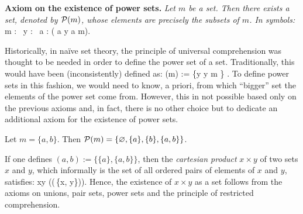 \textbf{Axiom on the existence of power sets.} \emph{Let $m$ be a set. Then there exists a set, denoted by $\mathcal{P}(m)$, whose elements are precisely the subsets of $m$. In symbols:}
\bse
\forall \, m : \exists \, y : \forall \, a : ( a \in y \eqv a \se m).
\ese

Historically, in na\"ive set theory, the principle of universal comprehension was thought to be needed in order to define the power set of a set. Traditionally, this would have been (inconsistently) defined as:
\bse
\cP (m) := \{y \mid y \se m \} .
\ese
To define power sets in this fashion, we would need to know, a priori, from which ``bigger'' set the elements of the power set come from. However, this in not possible based only on the previous axioms and, in fact, there is no other choice but to dedicate an additional axiom for the existence of power sets.

\be
Let $m = \{a,b\}$. Then $\mathcal{P}(m)=\{\varnothing,\{a\},\{b\},\{a,b\}\}$.
\ee

\br
If one defines $(a,b) := \{\{a\},\{a,b\}\}$, then the \emph{cartesian product} $x \times y$ of two sets $x$ and $y$, which informally is the set of all ordered pairs of elements of $x$ and $y$, satisfies:
\bse
x\times y \se \cP\left(\cP\left(\bigcup\,\{x, y\}\right)\right).
\ese
Hence, the existence of $x\times y$ as a set follows from the axioms on unions, pair sets, power sets and the principle of restricted comprehension.
\er

